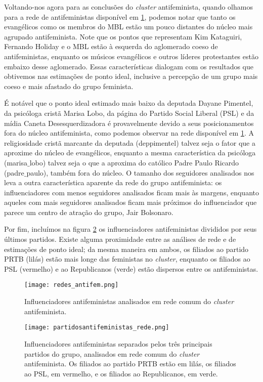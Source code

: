 \documentclass[
	12pt,				%
	openright,			%
	twoside,			%
	a4paper,			%
	english,			%
	brazil				%
	]{abntex2}
\begin{document}
 \clearpage

 Voltando-nos agora para as conclusões do \textit{cluster} antifeminista, quando olhamos para a rede de antifeministas disponível em \ref{antifemrede}, podemos notar que tanto os evangélicos como os membros do MBL estão um pouco distantes do núcleo mais agrupado antifeminista. Note que os pontos que representam Kim Kataguiri, Fernando Holiday e o MBL estão à esquerda do aglomerado coeso de antifeministas, enquanto os músicos evangélicos e outros líderes protestantes estão embaixo desse aglomerado. Essas características dialogam com os resultados que obtivemos nas estimações de ponto ideal, inclusive a percepção de um grupo mais coeso e mais afastado do grupo feminista.

 É notável que o ponto ideal estimado mais baixo da deputada Dayane Pimentel, da psicóloga cristã Marisa Lobo, da página do Partido Social Liberal (PSL) e da mídia Caneta Desesquerdizadora é provavelmente devido a seus posicionamentos fora do núcleo antifeminista, como podemos observar na rede disponível em \ref{antifemrede}. A religiosidade cristã marcante da deputada (deppimentel) talvez seja o fator que a aproxime do núcleo de evangélicos, enquanto a mesma característica da psicóloga (marisa$\_$lobo) talvez seja o que a aproxima do católico Padre Paulo Ricardo (padre$\_$paulo), também fora do núcleo. O tamanho dos seguidores analisados nos leva a outra característica aparente da rede do grupo antifeminista: os influenciadores com menos seguidores analisados ficam mais às margens, enquanto aqueles com mais seguidores analisados ficam mais próximos do influenciador que parece um centro de atração do grupo, Jair Bolsonaro.
 
 Por fim, incluímos na figura \ref{antifempartrede} os influenciadores antifeministas divididos por seus últimos partidos. Existe alguma proximidade entre as análises de rede e de estimações de ponto ideal; da mesma maneira em ambos, os filiados ao partido PRTB (lilás) estão mais longe das feministas no \textit{cluster}, enquanto os filiados ao PSL (vermelho) e ao Republicanos (verde) estão dispersos entre os antifeministas.

 \newpage
 \begin{figure}[!htbp]
    \centering
    \texttt{[image: redes\_antifem.png]}
    \caption{Influenciadores antifeministas analisados em rede comum do \textit{cluster} antifeminista.}
    \label{antifemrede}
 \end{figure}

 \newpage
 \begin{figure}[!htbp]
    \centering
    \texttt{[image: partidosantifeministas\_rede.png]}
    \caption{Influenciadores antifeministas separados pelos três principais partidos do grupo, analisados em rede comum do \textit{cluster} antifeminista. Os filiados ao partido PRTB estão em lilás, os filiados ao PSL, em vermelho, e os filiados ao Republicanos, em verde.}
    \label{antifempartrede}
 \end{figure}
 
\end{document}
